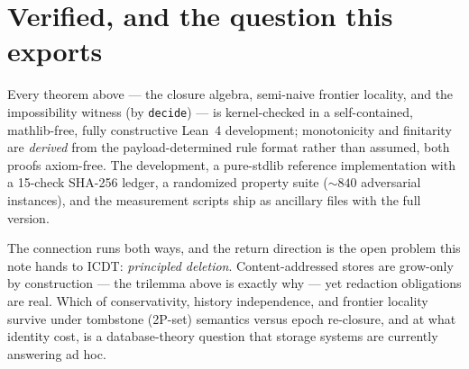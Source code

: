 \documentclass[a4paper,UKenglish,cleveref,autoref,thm-restate]{lipics-v2021}
\begin{document}
\section{Verified, and the question this exports}

Every theorem above --- the closure algebra, semi-naive frontier locality, and the impossibility witness (by \texttt{decide}) --- is kernel-checked in a self-contained, mathlib-free, fully constructive Lean~4 development; monotonicity and finitarity are \emph{derived} from the payload-determined rule format rather than assumed, both proofs axiom-free. The development, a pure-stdlib reference implementation with a 15-check SHA-256 ledger, a randomized property suite (${\sim}840$ adversarial instances), and the measurement scripts ship as ancillary files with the full version.

The connection runs both ways, and the return direction is the open problem this note hands to ICDT: \emph{principled deletion}. Content-addressed stores are grow-only by construction --- the trilemma above is exactly why --- yet redaction obligations are real. Which of conservativity, history independence, and frontier locality survive under tombstone (2P-set) semantics versus epoch re-closure, and at what identity cost, is a database-theory question that storage systems are currently answering ad hoc.


\end{document}
